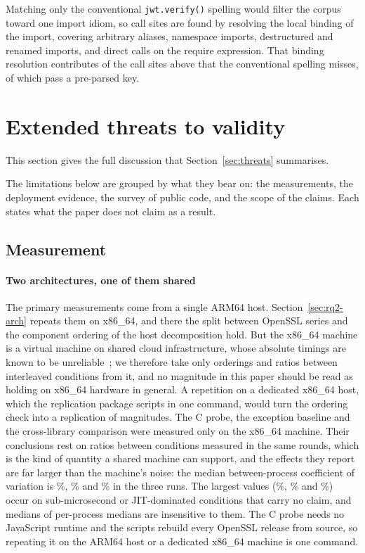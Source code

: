 \documentclass[preprint,12pt,authoryear]{elsarticle}
\begin{document}
Matching only the conventional \texttt{jwt.verify()} spelling would filter the
corpus toward one import idiom, so call sites are found by resolving the local
binding of the import, covering arbitrary aliases, namespace imports,
destructured and renamed imports, and direct calls on the require expression.
That binding resolution contributes \SampleRematchAdded{} of the call sites
above that the conventional spelling misses, of which \RematchSitesPreparsed{}
pass a pre-parsed key.


\section{Extended threats to validity}

This section gives the full discussion that Section~\ref{sec:threats}
summarises.


The limitations below are grouped by what they bear on: the measurements,
the deployment evidence, the survey of public code, and the scope of the
claims. Each states what the paper does not claim as a result.

\subsection{Measurement}\label{sec:threats-measure}

\paragraph{Two architectures, one of them shared} The primary measurements
come from a single ARM64 host. Section~\ref{sec:rq2-arch} repeats them on
x86\_64, and there the split between OpenSSL series and the component
ordering of the host decomposition hold. But the x86\_64 machine is a virtual machine on shared
cloud infrastructure, whose absolute timings are known to be
unreliable~\citep{laaber2019cloud}; we therefore take only orderings and ratios
between interleaved conditions from it, and no magnitude in this paper should
be read as holding on x86\_64 hardware in general. A repetition on a dedicated
x86\_64 host, which the replication package scripts in one command, would turn
the ordering check into a replication of magnitudes. The C probe, the exception
baseline and the cross-library comparison were measured only on the x86\_64
machine. Their conclusions rest on ratios between conditions measured in the
same rounds, which is the kind of quantity a shared machine can support, and
the effects they report are far larger than the machine's noise: the median
between-process coefficient of variation is \CProbeCvMedian\%,
\ExcCvMedian\% and \XlibCvMedian\% in the three runs. The largest values
(\CProbeCvMax\%, \ExcCvMax\% and \XlibCvMax\%) occur on sub-microsecond or
JIT-dominated conditions that carry no claim, and medians of per-process
medians are insensitive to them. The C probe needs no JavaScript runtime and
the scripts rebuild every OpenSSL release from source, so repeating it on the
ARM64 host or a dedicated x86\_64 machine is one command.
\end{document}
